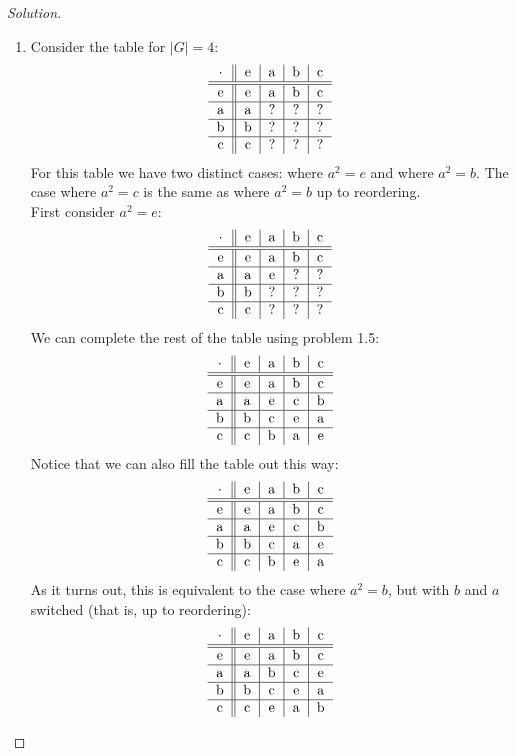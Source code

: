 \documentclass[12pt]{article}
\newenvironment{solution}
  {\renewcommand\qedsymbol{$\blacksquare$}\begin{proof}[Solution]}
{\end{proof}}
\begin{document}
\begin{solution}
\begin{enumerate}
    \item Consider the table for $|G|=4$:
      \[\begin{tabular}{c || c|c|c|c}
            $\cdot$ & e & a & b & c\\ \hline\hline
            e & e & a & b & c \\ \hline
            a & a & ? & ? & ? \\ \hline
            b & b & ? & ? & ? \\ \hline
            c & c & ? & ? & ? 
        \end{tabular}\]
        For this table we have two distinct cases: 
        where $a^2=e$ and where $a^2=b$. 
        The case where $a^2=c$ is the same as where $a^2=b$ up to reordering.\\
        First consider $a^2=e:$
        \[\begin{tabular}{c || c|c|c|c}
            $\cdot$ & e & a & b & c\\ \hline\hline
            e & e & a & b & c \\ \hline
            a & a & e & ? & ? \\ \hline
            b & b & ? & ? & ? \\ \hline
            c & c & ? & ? & ? 
        \end{tabular}\]
        We can complete the rest of the table using problem 1.5:
        \[\begin{tabular}{c || c|c|c|c}
            $\cdot$ & e & a & b & c\\ \hline\hline
            e & e & a & b & c \\ \hline
            a & a & e & c & b \\ \hline
            b & b & c & e & a \\ \hline
            c & c & b & a & e 
        \end{tabular}\]
        Notice that we can also fill the table out this way:
        \[\begin{tabular}{c || c|c|c|c}
            $\cdot$ & e & a & b & c\\ \hline\hline
            e & e & a & b & c \\ \hline
            a & a & e & c & b \\ \hline
            b & b & c & a & e \\ \hline
            c & c & b & e & a 
        \end{tabular}\]
        As it turns out, this is equivalent to the case where $a^2=b$,
        but with $b$ and $a$ switched (that is, up to reordering):
        \[\begin{tabular}{c || c|c|c|c}
            $\cdot$ & e & a & b & c\\ \hline\hline
            e & e & a & b & c \\ \hline
            a & a & b & c & e \\ \hline
            b & b & c & e & a \\ \hline
            c & c & e & a & b 
        \end{tabular}\]
  \end{enumerate}
\end{solution}
\end{document}
